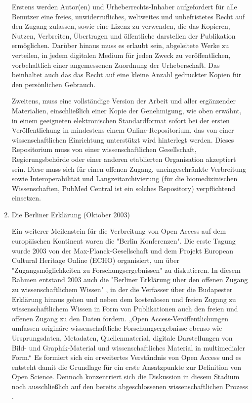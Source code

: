 \begin{enumerate}
Erstens werden Autor(en) und Urheberrechts-Inhaber aufgefordert für alle Benutzer eine freies, unwiderrufliches, weltweites und unbefristetes Recht auf den Zugang zulassen, sowie eine Lizenz zu verwenden, die das Kopieren, Nutzen, Verbreiten, Übertragen und öffentliche darstellen der Publikation ermöglichen. Darüber hinaus muss es erlaubt sein, abgeleitete Werke zu verteilen, in jedem digitalen Medium für jeden Zweck zu veröffentlichen, vorbehaltlich einer angemessenen Zuordnung der Urheberschaft. Das beinhaltet auch das das Recht auf eine kleine Anzahl gedruckter Kopien für den persönlichen Gebrauch. 

Zweitens, muss eine vollständige Version der Arbeit und aller ergänzender Materialien, einschließlich einer Kopie der Genehmigung, wie oben erwähnt, in einem geeigneten elektronischen Standardformat sofort bei der ersten Veröffentlichung in mindestens einem Online-Repositorium, das von einer wissenschaftlichen Einrichtung unterstützt wird hinterlegt werden. Dieses Repositorium muss von einer wissenschaftlichen Gesellschaft, Regierungsbehörde oder einer anderen etablierten Organisation akzeptiert sein. Diese muss sich für einen offenen Zugang, uneingeschränkte Verbreitung sowie Interoperabilität und Langzeitarchivierung (für die biomedizinischen Wissenschaften, PubMed Central ist ein solches Repository) verpflichtend einsetzen.

\item Die Berliner Erklärung (Oktober 2003)

Ein weiterer Meilenstein für die Verbreitung von Open Access auf dem europäischen Kontinent waren die "Berlin Konferenzen"\cite{CREATe_2014}. Die erste Tagung wurde 2003 von der Max-Planck-Gesellschaft und dem Projekt European Cultural Heritage Online (ECHO) organisiert, um über "Zugangsmöglichkeiten zu Forschungsergebnissen" zu diskutieren. In diesem Rahmen entstand 2003 auch die "Berliner Erklärung über den offenen Zugang zu wissenschaftlichem Wissen" \cite{berliner_erklaerung_2003}, in der die Verfasser über die Budapester Erklärung hinaus gehen und neben dem kostenlosen und freien Zugang zu wissenschaftlichem Wissen in Form von Publikationen auch den freien und offenen Zugang zu den Daten fordern. „Open Access-Veröffentlichungen umfassen originäre wissenschaftliche Forschungsergebnisse ebenso wie Ursprungsdaten, Metadaten, Quellenmaterial, digitale Darstellungen von Bild- und Graphik-Material und wissenschaftliches Material in multimedialer Form.“ \cite{berliner_erklaerung_2003} Es formiert sich ein erweitertes Verständnis von Open Access und es entsteht damit die Grundlage für ein erste Ansatzpunkte zur Definition von Open Science. Dennoch konzentriert sich die Diskussion in diesem Stadium noch ausschließlich auf den bereits abgeschlossenen wissenschaftlichen Prozess \cite{suchen}.

\end{enumerate}

